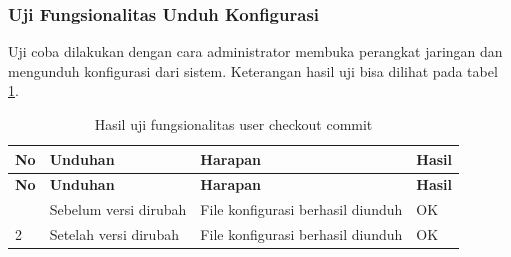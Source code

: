 	\subsubsection{Uji Fungsionalitas Unduh Konfigurasi}
	Uji coba dilakukan dengan cara administrator membuka perangkat jaringan dan mengunduh konfigurasi dari sistem. Keterangan hasil uji bisa dilihat pada tabel \ref{hasilUnduhKonfig}.\\
	\begin{longtable}{|p{}|p{}|p{}|p{}|}
		
		\caption{Hasil uji fungsionalitas user checkout commit} \label{hasilUnduhKonfig} \\
		\hline
		\textbf{No} & \textbf{Unduhan} & \textbf{Harapan} & \textbf{Hasil} \\ \hline
		\endfirsthead
		\hline
		\textbf{No} & \textbf{Unduhan} & \textbf{Harapan} & \textbf{Hasil} \\ \hline
		\endhead
		\endfoot
		\endlastfoot
		1 & Sebelum versi dirubah & File konfigurasi berhasil diunduh & OK\\ \hline
		2 & Setelah versi dirubah & File konfigurasi berhasil diunduh & OK\\ \hline
		
	\end{longtable}
	
	
